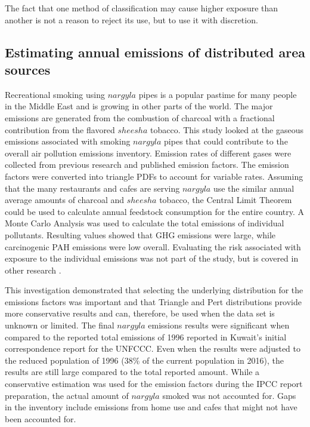 The fact that one method of classification may cause higher exposure than another is not a reason to reject its use, but to use it with discretion. 

\subsection{Estimating annual emissions of distributed area sources}
Recreational smoking using $nargyla$ pipes is a popular pastime for many people in the Middle East and is growing in other parts of the world.  The major emissions are generated from the combustion of charcoal with a fractional contribution from the flavored $sheesha$ tobacco.  This study looked at the gaseous emissions associated with smoking $nargyla$ pipes that could contribute to the overall air pollution emissions inventory.  Emission rates of different gases were collected from previous research and published emission factors.  The emission factors were converted into triangle PDFs to account for variable rates.  Assuming that the many restaurants and cafes are serving $nargyla$ use the similar annual average amounts of charcoal and $sheesha$ tobacco, the Central Limit Theorem could be used to calculate annual feedstock consumption for the entire country.  A Monte Carlo Analysis was used to calculate the total emissions of individual pollutants.  Resulting values showed that GHG emissions were large, while carcinogenic PAH emissions were low overall.  Evaluating the risk associated with exposure to the individual emissions was not part of the study, but is covered in other research \citep{Fromme2009, Moon2015, Mulla2015}.

This investigation demonstrated that selecting the underlying distribution for the emissions factors was important and that Triangle and Pert distributions provide more conservative results and can, therefore, be used when the data set is unknown or limited.  The final $nargyla$ emissions results were significant when compared to the reported total emissions of 1996 reported in Kuwait’s initial correspondence report for the UNFCCC.  Even when the results were adjusted to the reduced population of 1996 (38\% of the current population in 2016), the results are still large compared to the total reported amount. While a conservative estimation was used for the emission factors during the IPCC report preparation, the actual amount of $nargyla$ smoked was not accounted for. Gaps in the inventory include emissions from home use and cafes that might not have been accounted for.

